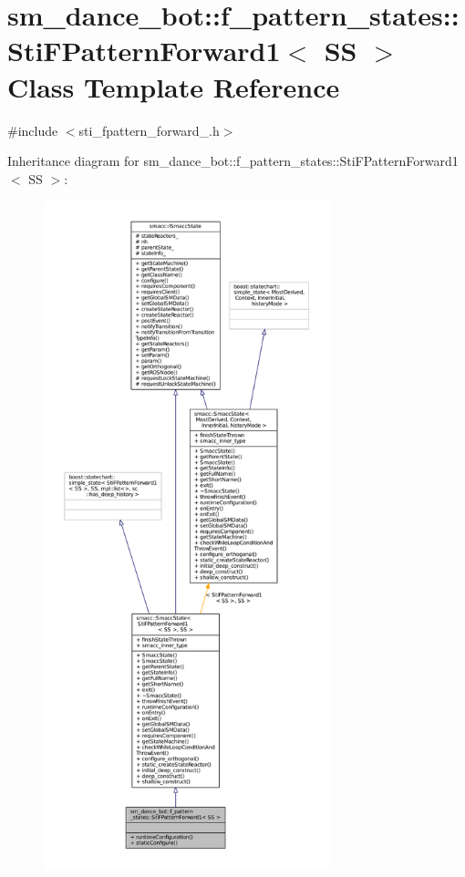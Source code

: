 \hypertarget{structsm__dance__bot_1_1f__pattern__states_1_1StiFPatternForward1}{}\section{sm\+\_\+dance\+\_\+bot\+:\+:f\+\_\+pattern\+\_\+states\+:\+:Sti\+F\+Pattern\+Forward1$<$ SS $>$ Class Template Reference}
\label{structsm__dance__bot_1_1f__pattern__states_1_1StiFPatternForward1}


{\ttfamily \#include $<$sti\+\_\+fpattern\+\_\+forward\+\_.\+h$>$}



Inheritance diagram for sm\+\_\+dance\+\_\+bot\+:\+:f\+\_\+pattern\+\_\+states\+:\+:Sti\+F\+Pattern\+Forward1$<$ SS $>$\+:
\nopagebreak
\begin{figure}[H]
\begin{center}
\leavevmode
\includegraphics[height=550pt]{structsm__dance__bot_1_1f__pattern__states_1_1StiFPatternForward1__inherit__graph}
\end{center}
\end{figure}


